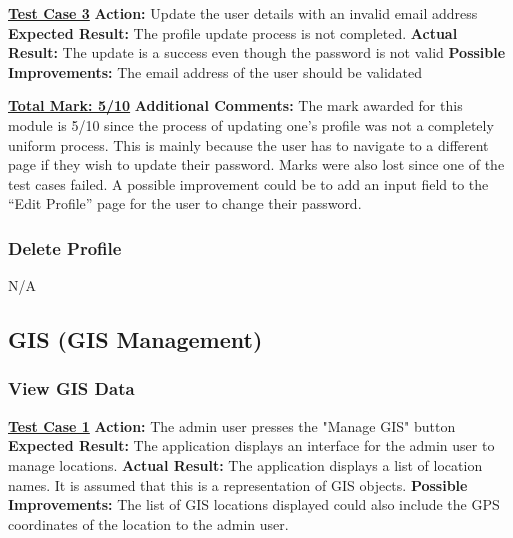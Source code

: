 \documentclass[english]{article}
\begin{document}
\textbf{\underline{Test Case 3}}\newline
\textbf{Action:} Update the user details with an invalid email address\newline
\textbf{Expected Result:} The profile update process is not completed.\newline
\textbf{Actual Result:} The update is a success even though the password is not valid\newline
\textbf{Possible Improvements:} The email address of the user should be validated \newline

\textbf{\underline{Total Mark: 5/10}}\newline
\textbf{Additional Comments:} The mark awarded for this module is 5/10 since the process of updating one’s profile was not a completely uniform process. This is mainly because the user has to navigate to a different page if they wish to update their password. Marks were also lost since one of the test cases failed. A possible improvement could be to add an input field to the “Edit Profile” page for the user to change their password. \newline

\subsubsection{Delete Profile}
N/A

\subsection{GIS (GIS Management)}

\subsubsection{View GIS Data}
\textbf{\underline{Test Case 1}}\newline
\textbf{Action:} The admin user presses the "Manage GIS" button\newline
\textbf{Expected Result:} The application displays an interface for the admin user to manage locations.\newline
\textbf{Actual Result:} The application displays a list of location names. It is assumed that this is a representation of GIS objects.\newline
\textbf{Possible Improvements:} The list of GIS locations displayed could also include the GPS coordinates of the location to the admin user.\newline
\end{document}
